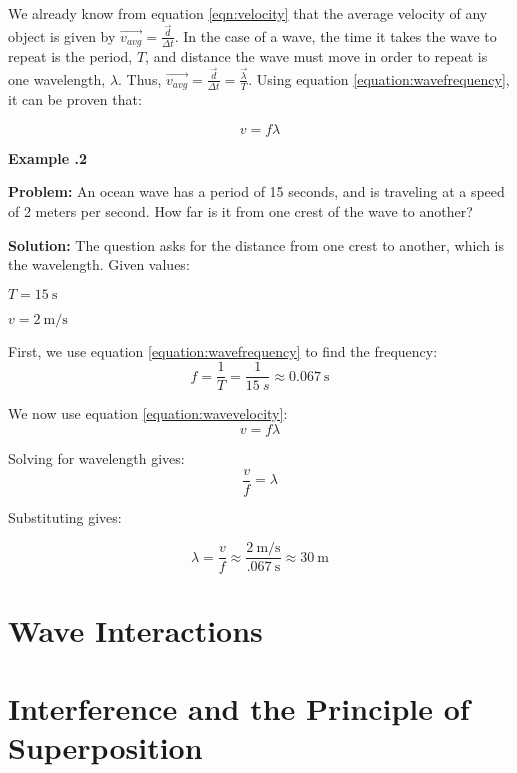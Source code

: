 	We already know from equation \ref{eqn:velocity} that the average velocity of any object is given by $\overrightarrow{v_{avg}} = \frac{\vec{d}}{\Delta t} $.  In the case of a wave, the time it takes the wave to repeat is the period, $T$, and distance the wave must move in order to repeat is one wavelength, $\lambda$.  Thus, $\overrightarrow{v_{avg}} = \frac{\vec{d}}{\Delta t} = \frac{\vec{\lambda}}{T}$.  Using equation \ref{equation:wavefrequency}, it can be proven that:
	
		\begin{mdframed}[backgroundcolor=orange!20!white]
		\begin{equation}
		v = f\lambda
		\label{equation:wavevelocity}
		\end{equation}
	\end{mdframed}	
	
	\begin{mdframed}[backgroundcolor=blue!10!white]
	\begin{center}
		
		
		\textbf{Example \thesection.2}	
	\end{center}
	
	\textbf{Problem: }An ocean wave has a period of 15 seconds, and is traveling at a speed of 2 meters per second.  How far is it from one crest of the wave to another? 
	
	\vspace{0.1in}
	
	\textbf{Solution:} 
	The question asks for the distance from one crest to another, which is the wavelength.  
	Given values:  \begin{center}
					$T = \SI{15}{\s}$

					$v = \SI[per-mode = symbol]{2}{\m\per\s} $
					\end{center}

	First, we use equation \ref{equation:wavefrequency} to find the frequency:
		\begin{equation*}
	f = \frac{1}{T} = \frac{1}{\SI{15}{s}} \approx \SI{0.067}{\s}
	\end{equation*}

	We now use equation \ref{equation:wavevelocity}:
	\begin{equation*}
		v = f\lambda
	\end{equation*}
	
	Solving for wavelength gives:
		\begin{equation*}
	\frac{v}{f} = \lambda
	\end{equation*}
	
	Substituting gives: 
	
	
	\begin{equation*}
	\lambda = \frac{v}{f} \approx \frac{\SI[per-mode = symbol]{2}{\m\per\s}}{\SI{.067}{\s}} \approx \boxed{\SI{30}{\m}}
	\end{equation*}		
	
\end{mdframed}
	
		
	
	\newpage
	
	\section{Wave Interactions}
	\section{Interference and the Principle of Superposition}
	

	


